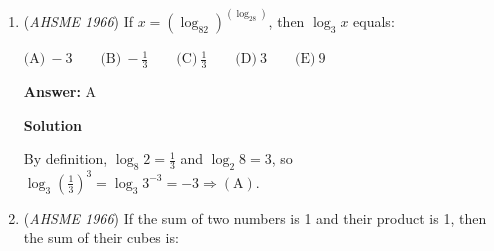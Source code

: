 \begin{enumerate}
 $\text{(A)} \ 27 \qquad \text{(B)} \ 21 \qquad \text{(C)} \ \sqrt {389} \qquad \text{(D)} \ 15 \qquad \text{(E)} \ \text{undetermined}$

 \textbf{Answer: }B



\textbf{Solution}

<a href="/wiki/index.php?title=File:1966\_AHSME-8.JPG" title="File:1966 AHSME-8.JPG">Error creating thumbnail: Unable to save thumbnail to destination</a>

 
Let $O$ be the center of the circle of radius $10$ and $P$ be the center of the circle of radius $17$. Chord $\overline{AB} = 16$ feet.

 $\overline{OA} = \overline{OB} = 10$ feet, since they are radii of the same circle. Hence, $\triangle OAB$ is isoceles with base $AB$. The height of $\triangle OAB$ from $O$ to $AB$ is $\sqrt {\overline{OB}^2 - (\frac{\overline{AB}}{2})^2} = \sqrt {10^2 - (\frac{16}{2})^2} = \sqrt {100 - 8^2} = \sqrt {100 - 64} = \sqrt {36} = 6$

 Similarly, $\overline{PA} = \overline{PB} = 17$. Therefore, $\triangle PAB$ is also isoceles with base $AB$. The height of the triangle from $P$ to $AB$ is $\sqrt {\overline{PB}^2 - (\frac{\overline{AB}}{2})^2} = \sqrt {17^2 - (\frac{16}{2})^2} = \sqrt {289 - 8^2} = \sqrt {289 - 64} = \sqrt {225} = 15$

 The distance between the centers of the circles (points $P$ and $O$) is the sum of the heights of $\triangle OAB$ and $\triangle PAB$, which is $6 + 15 = 21 \Rightarrow \textbf{(B)}$



	\item (\textit{AHSME 1966}) If $x = (\log_82)^{(\log_28)}$, then $\log_3x$ equals:


 $\text{(A)} \ - 3 \qquad \text{(B)} \ - \frac13 \qquad \text{(C)} \ \frac13 \qquad \text{(D)} \ 3 \qquad \text{(E)} \ 9$

 \textbf{Answer: }A



\textbf{Solution}

By definition, $\log_8 2 = \frac 13$ and $\log_2 8 = 3$, so $\log_3 \left(\frac{1}{3}\right)^3 = \log_3 3^{-3} = -3 \Rightarrow \mathrm{(A)}$. 

 


	\item (\textit{AHSME 1966}) If the sum of two numbers is 1 and their product is 1, then the sum of their cubes is:



\end{enumerate}
